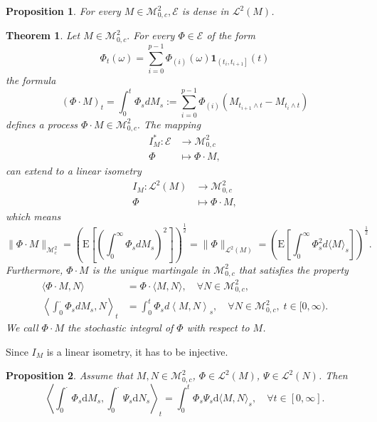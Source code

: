 \documentclass{report}
\newtheorem{proposition}{Proposition}[section]
\newtheorem{theorem}{Theorem}[section]
\theoremstyle{nonumberplain}
\begin{document}
\begin{proposition}
For every $M \in \mathscr{M}^2_{0,c}, \mathscr{E}$ is dense in $\mathscr{L}^{2}(M)$.
\end{proposition}

\begin{theorem}
Let $M \in \mathscr{M}^2_{0,c} .$ For every $\Phi \in \mathscr{E}$ of the form
\[
\Phi_{t}(\omega)=\sum_{i=0}^{p-1} \Phi_{(i)}(\omega) \mathbf{1}_{\left(t_{i}, t_{i+1}\right]}(t)
\]
the formula
\[
(\Phi \cdot M)_{t}=\int_{0}^{t}\Phi_sdM_s:=\sum_{i=0}^{p-1} \Phi_{(i)}\left(M_{t_{i+1} \wedge t}-M_{t_{i} \wedge t}\right)
\]
defines a process $\Phi \cdot M \in \mathscr{M}^2_{0,c}.$ The mapping
\begin{align*}
	I_M^*:\mathscr{E}&\longrightarrow\mathscr{M}^2_{0,c}\\
\Phi &\longmapsto \Phi \cdot M,
\end{align*}
can extend to a linear isometry
\begin{align*}
I_M:\mathscr{L}^{2}(M)&\longrightarrow\mathscr{M}^2_{0,c}\\
\Phi &\longmapsto \Phi \cdot M,
\end{align*}
which means
\[
\|\Phi \cdot M\|_{\mathscr{M}^2_c}=\left(\mathrm{E}\left[\left(\int_{0}^{\infty}\Phi_sdM_s\right)^2\right]\right)^{\tfrac{1}{2}}=\|\Phi\|_{\mathscr{L}^2(M)}=\left(\mathrm{E}\left[\int_{0}^{\infty} \Phi_{s}^{2} d\langle M\rangle_{s}\right]\right)^{\tfrac{1}{2}}.
\]
Furthermore, $\Phi \cdot M$ is the unique martingale in $\mathscr{M}^2_{0,c}$ that satisfies the property
\begin{align*}
\langle \Phi \cdot M, N\rangle&= \Phi \cdot\langle M, N\rangle, \quad \forall N \in\mathscr{M}^2_{0,c},\\
\left\langle \int_{0}^{\cdot}\Phi_sdM_s, N\right\rangle_t&= \int_{0}^{t}\Phi_sd\left\langle M, N\right\rangle_s, \quad \forall N \in\mathscr{M}^2_{0,c},\;t\in[0,\infty).
\end{align*}
We call $\Phi \cdot M$ the stochastic integral of $\Phi$ with respect to $M$.
\end{theorem}

Since $I_M$ is a linear isometry, it has to be injective.

\begin{proposition}
	Assume that $M,N\in\mathscr{M}^2_{0,c}$, $\Phi\in\mathscr{L}^2(M)$, $\Psi\in\mathscr{L}^2(N)$. Then
	\[
	\left\langle\int_{0}^\cdot \Phi_{s} \mathrm{d} M_{s}, \int_{0}^\cdot \Psi_{s} \mathrm{d} N_{s}\right\rangle_{t}=\int_{0}^{t} \Phi_{s}\Psi_{s} \mathrm{d}\langle M, N\rangle_{s},\quad\forall t\in[0,\infty].
	\]
\end{proposition}
\end{document}
